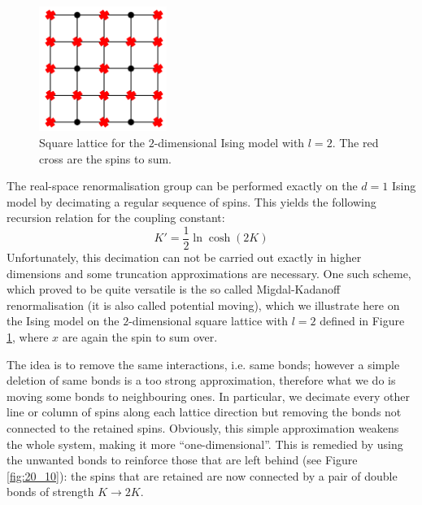 \documentclass[../../Main/Main.tex]{subfiles}
\begin{document}
\begin{figure}[H]
\centering
\includegraphics[width=0.37\textwidth]{./img/10.pdf}
\caption{\label{fig:20_9} Square lattice for the \( 2 \)-dimensional Ising model with \( l=2 \). The red cross are the spins to sum.}
\end{figure}

The real-space renormalisation group can be performed exactly on the \( d=1 \)  Ising model by decimating a regular sequence of spins. This yields the following recursion relation for the coupling constant:
\begin{equation*}
  K' = \frac{1}{2} \ln \cosh (2K)
\end{equation*}
Unfortunately, this decimation can not be carried out exactly in higher dimensions and some truncation approximations are necessary.
One such scheme, which proved to be quite versatile is the so called Migdal-Kadanoff renormalisation (it is also called potential moving), which we illustrate here on the Ising model on the \( 2 \)-dimensional square lattice with \( l=2 \) defined in Figure \ref{fig:20_9}, where \( x \) are again the spin to sum over.

The idea is to remove the same interactions, i.e. same bonds; however a simple deletion of same bonds is a too strong approximation, therefore what we do is moving some bonds to neighbouring ones. In particular, we decimate every other line or column of spins along each lattice direction but removing the bonds not connected to the retained spins. Obviously, this simple approximation weakens the whole system, making it more “one-dimensional”. This is remedied by using the unwanted bonds to reinforce those that are left behind (see Figure \ref{fig:20_10}): the spins that are retained are now connected by a pair of double bonds of strength \( K \rightarrow 2K \).
\end{document}
